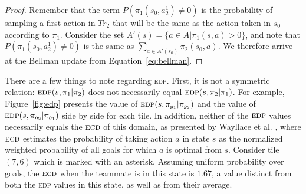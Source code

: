 \documentclass[letterpaper]{article}
\newtheorem{theorem}{Theorem}
\newtheorem{definition}{Definition}
\begin{document}
\begin{proof}
Remember that the term $P(\pi_1(s_0, a_2^1) \neq 0)$ is the probability of sampling a first action in $Tr_2$ that will be the same as the action taken in $s_0$ according to $\pi_1$. 
Consider the set $A'(s) = \{a\in A | \pi_1(s,a) > 0\}$, and note that $P(\pi_1(s_0, a_2^1) \neq 0)$ is the same as $\sum\limits_{a\in A'(s_0)}\pi_2(s_0, a)$.
We therefore arrive at the Bellman update from Equation~\ref{eq:bellman}.
\end{proof}

There are a few things to note regarding \textsc{edp}. First, it is not a symmetric relation: $\textsc{edp}(s, \pi_1 | \pi_2)$ does not necessarily equal $\textsc{edp}(s, \pi_2 | \pi_1)$. For example, Figure~\ref{fig:edp} presents the value of $\textsc{edp}(s, \pi_{g_1} | \pi_{g_2})$ and the value of $\textsc{edp}(s, \pi_{g_2} | \pi_{g_1})$ side by side for each tile. In addition, neither of the $\textsc{edp}$ values necessarily equals the $\textsc{ecd}$ of this domain, as presented by Wayllace et al. , where $\textsc{ecd}$ estimates the probability of taking action $a$ in state $s$ as the normalized weighted probability of all goals for which $a$ is optimal from $s$. 
 Consider tile $(7,6)$ which is marked with an asterisk. Assuming uniform probability over goals, the $\textsc{ecd}$ when the teammate is in this state is $1.67$, a value distinct from both the \textsc{edp} values in this state, as well as from their average.

\end{document}
